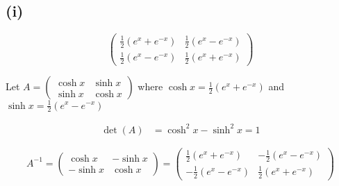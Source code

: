 \subsection*{(i)}
\[
	\begin{pmatrix}
		\frac{1}{2}(e^x + e^{-x}) & \frac{1}{2}(e^x - e^{-x}) \\
		\frac{1}{2}(e^x - e^{-x}) & \frac{1}{2}(e^x + e^{-x})
	\end{pmatrix}
\]

Let $A = \begin{pmatrix}
		\cosh x & \sinh x \\
		\sinh x & \cosh x
	\end{pmatrix}$ where $\cosh x = \frac{1}{2}(e^x + e^{-x})$ and $\sinh x = \frac{1}{2}(e^x - e^{-x})$

\begin{align}
	\det(A) & = \cosh^2 x - \sinh^2 x = 1
\end{align}

\[
	A^{-1} = \begin{pmatrix}
		\cosh x  & -\sinh x \\
		-\sinh x & \cosh x
	\end{pmatrix} = \begin{pmatrix}
		\frac{1}{2}(e^x + e^{-x})  & -\frac{1}{2}(e^x - e^{-x}) \\
		-\frac{1}{2}(e^x - e^{-x}) & \frac{1}{2}(e^x + e^{-x})
	\end{pmatrix}
\]